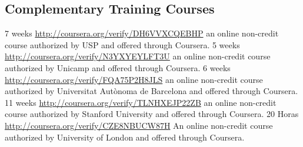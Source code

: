 \documentclass[11pt,a4paper,sans]{moderncv} %
\begin{document}
\subsection{Complementary Training Courses}
	      {7 weeks}
	      {\url{http://coursera.org/verify/DH6VVXCQEBHP}}{}
	      {an online non-credit course authorized by USP and offered through Coursera.}
	      {5 weeks}
	      {\url{http://coursera.org/verify/N3YXYEYLFT3U}}{}
	      {an online non-credit course authorized by Unicamp and offered through Coursera.}
	      {6 weeks}
	      {\url{http://coursera.org/verify/FQA75P2H8JLS}}{}
	      {an online non-credit course authorized by Universitat Autònoma de Barcelona and offered through Coursera.}
	      {11 weeks}
	      {\url{http://coursera.org/verify/TLNHXEJP22ZB}}{}
	      {an online non-credit course authorized by Stanford University and offered through Coursera.}
	      {20 Horas}
	      {\url{http://coursera.org/verify/CZE8NBUCW87H}}{}
	      {An online non-credit course authorized by University of London and offered through Coursera.}






\end{document}
